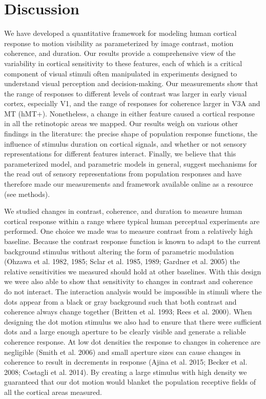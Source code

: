 \documentclass{report}
\begin{document}
\section{Discussion}

We have developed a quantitative framework for modeling human cortical response to motion visibility as parameterized by image contrast, motion coherence, and duration. Our results provide a comprehensive view of the variability in cortical sensitivity to these features, each of which is a critical component of visual stimuli often manipulated in experiments designed to understand visual perception and decision-making. Our measurements show that the range of responses to different levels of contrast was larger in early visual cortex, especially V1, and the range of responses for coherence larger in V3A and MT (hMT+). Nonetheless, a change in either feature caused a cortical response in all the retinotopic areas we mapped. Our results weigh on various other findings in the literature: the precise shape of population response functions, the influence of stimulus duration on cortical signals, and whether or not sensory representations for different features interact. Finally, we believe that this parameterized model, and parametric models in general, suggest mechanisms for the read out of sensory representations from population responses and have therefore made our measurements and framework available online as a resource (see methods).

We studied changes in contrast, coherence, and duration to measure human cortical response within a range where typical human perceptual experiments are performed. One choice we made was to measure contrast from a relatively high baseline. Because the contrast response function is known to adapt to the current background stimulus without altering the form of parametric modulation (Ohzawa et al. 1982, 1985; Sclar et al. 1985, 1989; Gardner et al. 2005) the relative sensitivities we measured should hold at other baselines. With this design we were also able to show that sensitivity to changes in contrast and coherence do not interact. The interaction analysis would be impossible in stimuli where the dots appear from a black or gray background such that both contrast and coherence always change together (Britten et al. 1993; Rees et al. 2000). When designing the dot motion stimulus we also had to ensure that there were sufficient dots and a large enough aperture to be clearly visible and generate a reliable coherence response. At low dot densities the response to changes in coherence are negligible (Smith et al. 2006) and small aperture sizes can cause changes in coherence to result in decrements in response (Ajina et al. 2015; Becker et al. 2008; Costagli et al. 2014). By creating a large stimulus with high density we guaranteed that our dot motion would blanket the population receptive fields of all the cortical areas measured.
\end{document}
